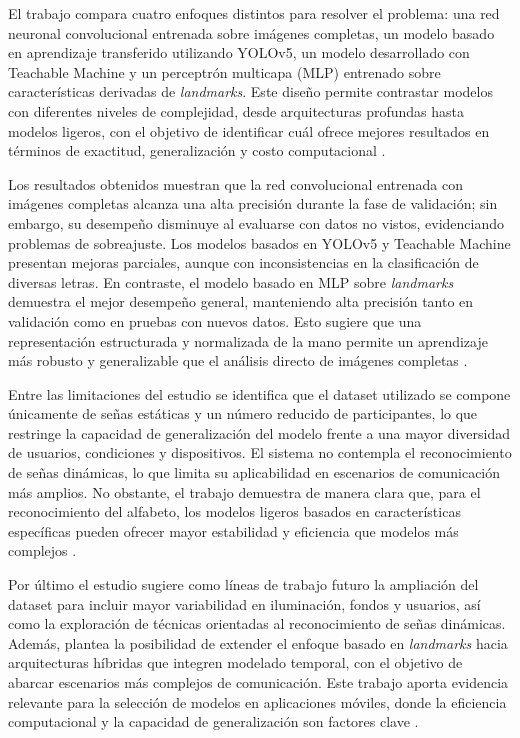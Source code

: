 	El trabajo compara cuatro enfoques distintos para resolver el problema: una red neuronal convolucional entrenada sobre imágenes completas, un modelo basado en aprendizaje transferido utilizando YOLOv5, un modelo desarrollado con Teachable Machine y un perceptrón multicapa (MLP) entrenado sobre características derivadas de \textit{landmarks}. Este diseño permite contrastar modelos con diferentes niveles de complejidad, desde arquitecturas profundas hasta modelos ligeros, con el objetivo de identificar cuál ofrece mejores resultados en términos de exactitud, generalización y costo computacional \cite{salgado2024lsm_ml}.
	
	Los resultados obtenidos muestran que la red convolucional entrenada con imágenes completas alcanza una alta precisión durante la fase de validación; sin embargo, su desempeño disminuye al evaluarse con datos no vistos, evidenciando problemas de sobreajuste. Los modelos basados en YOLOv5 y Teachable Machine presentan mejoras parciales, aunque con inconsistencias en la clasificación de diversas letras. En contraste, el modelo basado en MLP sobre \textit{landmarks} demuestra el mejor desempeño general, manteniendo alta precisión tanto en validación como en pruebas con nuevos datos. Esto sugiere que una representación estructurada y normalizada de la mano permite un aprendizaje más robusto y generalizable que el análisis directo de imágenes completas \cite{salgado2024lsm_ml}.
	
	Entre las limitaciones del estudio se identifica que el dataset utilizado se compone únicamente de señas estáticas y un número reducido de participantes, lo que restringe la capacidad de generalización del modelo frente a una mayor diversidad de usuarios, condiciones y dispositivos. El sistema no contempla el reconocimiento de señas dinámicas, lo que limita su aplicabilidad en escenarios de comunicación más amplios. No obstante, el trabajo demuestra de manera clara que, para el reconocimiento del alfabeto, los modelos ligeros basados en características específicas pueden ofrecer mayor estabilidad y eficiencia que modelos más complejos \cite{salgado2024lsm_ml}.
	
	Por último el estudio sugiere como líneas de trabajo futuro la ampliación del dataset para incluir mayor variabilidad en iluminación, fondos y usuarios, así como la exploración de técnicas orientadas al reconocimiento de señas dinámicas. Además, plantea la posibilidad de extender el enfoque basado en \textit{landmarks} hacia arquitecturas híbridas que integren modelado temporal, con el objetivo de abarcar escenarios más complejos de comunicación. Este trabajo aporta evidencia relevante para la selección de modelos en aplicaciones móviles, donde la eficiencia computacional y la capacidad de generalización son factores clave \cite{salgado2024lsm_ml}.
	
